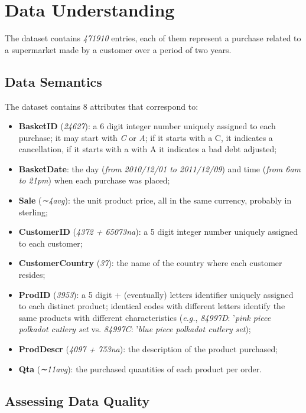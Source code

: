 \section{Data Understanding}

The dataset contains \emph{471910} entries, each of them represent a purchase related to a supermarket made by a customer over a period of two years.

\subsection{Data Semantics}

The dataset contains 8 attributes that correspond to:

\begin{itemize}
\item \textbf{BasketID} (\emph{24627}): a 6 digit integer number uniquely assigned to each purchase; it may start with \emph{C} or \emph{A}; if it starts with a C, it indicates a cancellation, if it starts with a with A it indicates a bad debt adjusted;
\item \textbf{BasketDate}: the day (\emph{from 2010/12/01 to 2011/12/09}) and time (\emph{from 6am to 21pm}) when each purchase was placed;
\item \textbf{Sale} (\emph{∼4avg}): the unit product price, all in the same currency, probably in sterling;
\item \textbf{CustomerID} (\emph{4372 + 65073na}): a 5 digit integer number uniquely assigned to each customer;
\item \textbf{CustomerCountry} (\emph{37}): the name of the country where each customer resides;
\item \textbf{ProdID} (\emph{3953}): a 5 digit + (eventually) letters identifier uniquely assigned to each distinct product; identical codes with different letters identify the same products with different characteristics (\emph{e.g.}, \emph{84997D}: '\emph{pink piece polkadot cutlery set} vs. \emph{84997C}: '\emph{blue piece polkadot cutlery set});
\item \textbf{ProdDescr} (\emph{4097 + 753na}): the description of the product purchased;
\item \textbf{Qta} (\emph{∼11avg}): the purchased quantities of each product per order.
\end{itemize}

\subsection{Assessing Data Quality}

